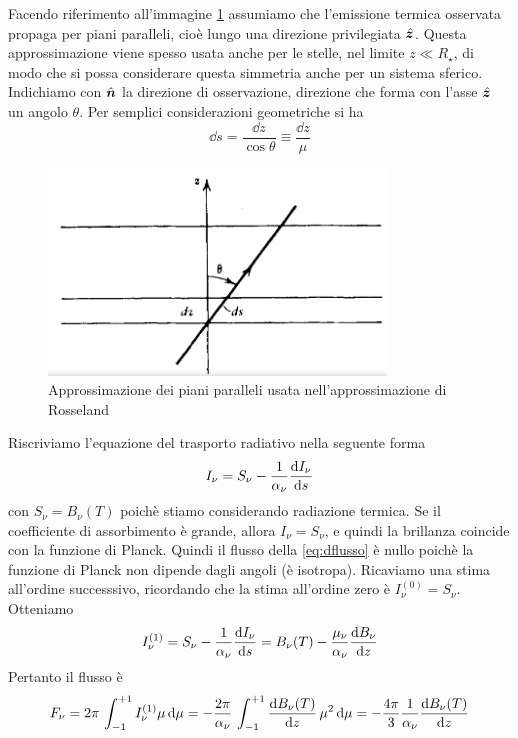 Facendo riferimento all'immagine \ref{fig:Rosseland} assumiamo che l'emissione termica osservata propaga per piani paralleli, cioè lungo una direzione privilegiata $\vers{z}$. Questa approssimazione viene spesso usata anche per le stelle, nel limite $z\ll R_\star$, di modo che si possa considerare questa simmetria anche per un sistema sferico. Indichiamo con $\vers{n}$ la direzione di osservazione, direzione che forma con l'asse $\vers{z}$ un angolo $\theta$. Per semplici considerazioni geometriche si ha
\begin{equation}
\dd s= \dfrac{\dd z}{\cos\theta}\equiv\dfrac{\dd z}{\mu}
\end{equation}
\begin{figure}
\begin{center}
\includegraphics[width=0.8\textwidth]{img/Rosseland}
\caption{Approssimazione dei piani paralleli usata nell'approssimazione di Rosseland} \label{fig:Rosseland}
\end{center}
\end{figure}
Riscriviamo l'equazione del trasporto radiativo nella seguente forma
\begin{equation}
I_\nu = S_\nu - \dfrac{1}{\alpha_\nu} \dfrac{\mathrm{d} {I_\nu}}{\mathrm{d} {s}}
\end{equation}
con $S_\nu = B_\nu(T)$ poichè stiamo considerando radiazione termica. Se il coefficiente di assorbimento è grande, allora $I_\nu = S_\nu$, e quindi la brillanza coincide con la funzione di Planck. Quindi il flusso della \ref{eq:dflusso} è nullo poichè la funzione di Planck non dipende dagli angoli (è isotropa). Ricaviamo una stima all'ordine successsivo, ricordando che la stima all'ordine zero è $I_\nu^{(0)} = S_\nu$. Otteniamo
\begin{equation}
I_\nu^{(1)} = S_\nu - \dfrac{1}{\alpha_\nu} \dfrac{\mathrm{d} {I_\nu}}{\mathrm{d} {s}} = B_\nu(T) - \dfrac{\mu_\nu}{\alpha_\nu}\dfrac{\mathrm{d} {B_\nu}}{\mathrm{d} {z}}
\end{equation}
Pertanto il flusso è 
\begin{equation}
F_\nu = 2\pi \, \int_{-1}^{+1} I_\nu^{(1)} \mu \, \mathrm{d} \mu = - \dfrac{2\pi}{\alpha_\nu} \, \int_{-1}^{+1} \dfrac{\mathrm{d} {B_\nu(T)}}{\mathrm{d} {z}} \, \mu^2 \,\mathrm{d}\mu = -\dfrac{4\pi}{3} \dfrac{1}{\alpha_\nu}\dfrac{\mathrm{d} {B_\nu(T)}}{\mathrm{d} {z}}
\end{equation}
